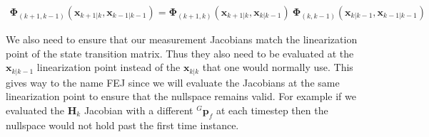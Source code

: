 \begin{align*} \mathbf{\Phi}_{(k+1,k-1)}(\mathbf{x}_{k+1|k},\mathbf{x}_{k-1|k-1}) = \mathbf{\Phi}_{(k+1,k)}(\mathbf{x}_{k+1|k},\mathbf{x}_{k|k-1}) ~ \mathbf{\Phi}_{(k,k-1)}(\mathbf{x}_{k|k-1},\mathbf{x}_{k-1|k-1}) \end{align*}

We also need to ensure that our measurement Jacobians match the linearization point of the state transition matrix. Thus they also need to be evaluated at the $\mathbf{x}_{k|k-1}$ linearization point instead of the $\mathbf{x}_{k|k}$ that one would normally use. This gives way to the name F\+EJ since we will evaluate the Jacobians at the same linearization point to ensure that the nullspace remains valid. For example if we evaluated the $\mathbf H_k $ Jacobian with a different $ {}^G\mathbf{p}_f $ at each timestep then the nullspace would not hold past the first time instance. 